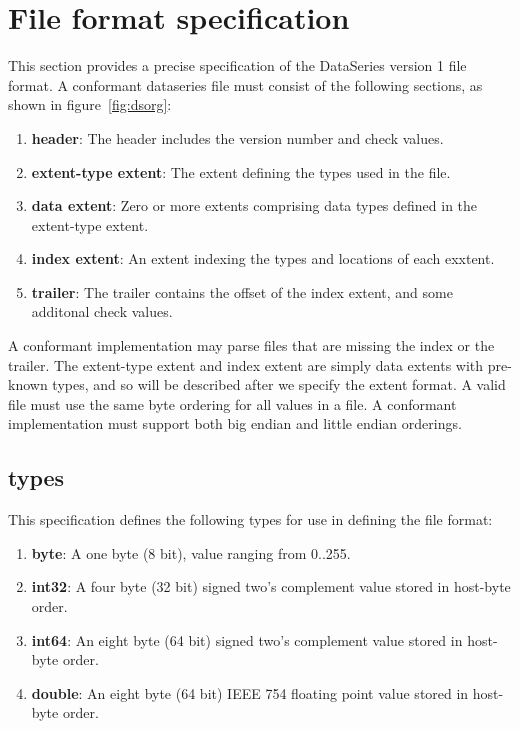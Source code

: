 \section{File format specification}

\newcommand{\packFieldOrdering}{{\tt pack\_field\_ordering}\xspace}

This section provides a precise specification of the DataSeries
version 1 file format.  A conformant dataseries file must consist of
the following sections, as shown in figure~\ref{fig:dsorg}:

\begin{enumerate}
\item {\bf header}: The header includes the version number and check values.
\item {\bf extent-type extent}: The extent defining the types used in the file.
\item {\bf data extent}: Zero or more extents comprising data types defined in the extent-type extent.
\item {\bf index extent}: An extent indexing the types and locations of each exxtent.
\item {\bf trailer}: The trailer contains the offset of the index extent, and some additonal check values.
\end{enumerate}

A conformant implementation may parse files that are missing the index
or the trailer.  The extent-type extent and index extent are simply
data extents with pre-known types, and so will be described after we
specify the extent format.  A valid file must use the same byte
ordering for all values in a file.  A conformant implementation must
support both big endian and little endian orderings.

\subsection{types}

This specification defines the following types for use in defining the file format:

\begin{enumerate}
\item {\bf byte}: A one byte (8 bit), value ranging from 0..255.
\item {\bf int32}: A four byte (32 bit) signed two's complement value stored in host-byte order.
\item {\bf int64}: An eight byte (64 bit) signed two's complement value stored in host-byte order.
\item {\bf double}: An eight byte (64 bit) IEEE 754 floating point value stored in host-byte order.
\end{enumerate}

